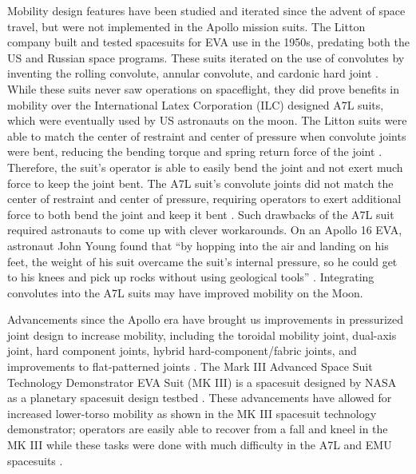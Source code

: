 \documentclass[defaultstyle,11pt]{thesis}
\begin{document}
Mobility design features have been studied and iterated since the advent of space travel, but were not implemented in the Apollo mission suits.
The Litton company built and tested spacesuits for EVA use in the 1950s, predating both the US and Russian space programs.
These suits iterated on the use of convolutes by inventing the rolling convolute, annular convolute, and cardonic hard joint \citep{Harris2001}.
While these suits never saw operations on spaceflight, they did prove benefits in mobility over the International Latex Corporation (ILC) designed A7L suits, which were eventually used by US astronauts on the moon.
The Litton suits were able to match the center of restraint and center of pressure when convolute joints were bent, reducing the bending torque and spring return force of the joint \citep{Harris2001}.
Therefore, the suit's operator is able to easily bend the joint and not exert much force to keep the joint bent.
The A7L suit's convolute joints did not match the center of restraint and center of pressure, requiring operators to exert additional force to both bend the joint and keep it bent \citep{Harris2001}.
Such drawbacks of the A7L suit required astronauts to come up with clever workarounds.
On an Apollo 16 EVA, astronaut John Young found that ``by hopping into the air and landing on his feet, the weight of his suit overcame the suit's internal pressure, so he could get to his knees and pick up rocks without using geological tools'' \citep{Portree1997}.
Integrating convolutes into the A7L suits may have improved mobility on the Moon.

Advancements since the Apollo era have brought us improvements in pressurized joint design to increase mobility, including the toroidal mobility joint, dual-axis joint, hard component joints, hybrid hard-component/fabric joints, and improvements to flat-patterned joints \citep{Harris2001}.
The Mark III Advanced Space Suit Technology Demonstrator EVA Suit (MK III) is a spacesuit designed by NASA as a planetary spacesuit design testbed \citep{Kosmo1988}.
These advancements have allowed for increased lower-torso mobility as shown in the MK III spacesuit technology demonstrator; operators are easily able to recover from a fall and kneel in the MK III while these tasks were done with much difficulty in the A7L and EMU spacesuits \citep{Kosmo1998}.
\end{document}

